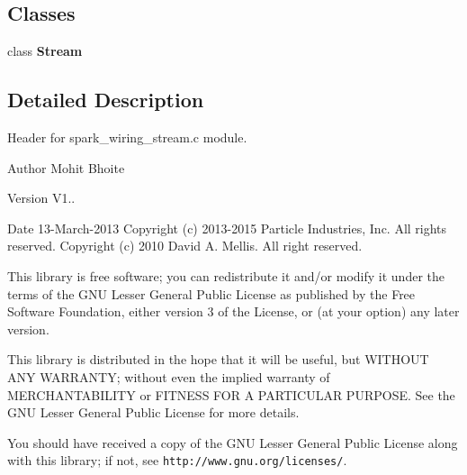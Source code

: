 \subsection*{Classes}
\begin{DoxyCompactItemize}
\item 
class \textbf{ Stream}
\end{DoxyCompactItemize}


\subsection{Detailed Description}
Header for spark\+\_\+wiring\+\_\+stream.\+c module. 

\begin{DoxyAuthor}{Author}
Mohit Bhoite 
\end{DoxyAuthor}
\begin{DoxyVersion}{Version}
V1.. 
\end{DoxyVersion}
\begin{DoxyDate}{Date}
13-\/\+March-\/2013 Copyright (c) 2013-\/2015 Particle Industries, Inc. All rights reserved. Copyright (c) 2010 David A. Mellis. All right reserved.
\end{DoxyDate}
This library is free software; you can redistribute it and/or modify it under the terms of the G\+NU Lesser General Public License as published by the Free Software Foundation, either version 3 of the License, or (at your option) any later version.

This library is distributed in the hope that it will be useful, but W\+I\+T\+H\+O\+UT A\+NY W\+A\+R\+R\+A\+N\+TY; without even the implied warranty of M\+E\+R\+C\+H\+A\+N\+T\+A\+B\+I\+L\+I\+TY or F\+I\+T\+N\+E\+SS F\+OR A P\+A\+R\+T\+I\+C\+U\+L\+AR P\+U\+R\+P\+O\+SE. See the G\+NU Lesser General Public License for more details.

You should have received a copy of the G\+NU Lesser General Public License along with this library; if not, see {\tt http\+://www.\+gnu.\+org/licenses/}. 